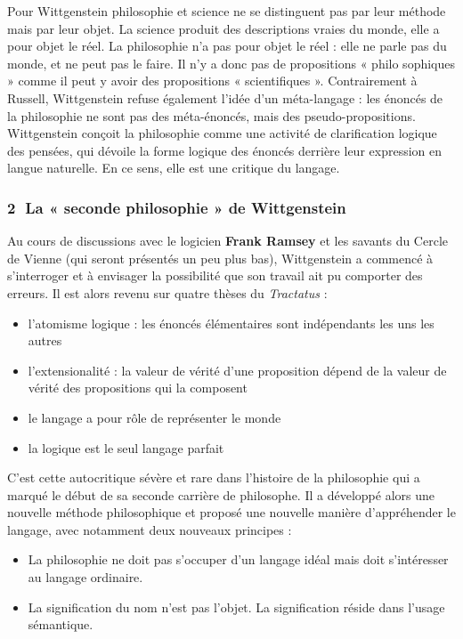 Pour Wittgenstein philosophie et science ne se distinguent pas par leur méthode mais par leur objet. La science produit des descriptions vraies du monde, elle a pour objet le réel. La philosophie n’a pas pour objet le réel : elle ne parle pas du monde, et ne peut pas le faire. Il n’y a donc pas de propositions « philo sophiques » comme il peut y avoir des propositions « scientifiques ». Contrairement à Russell, Wittgenstein refuse également l’idée d’un méta-langage : les énoncés de la philosophie ne sont pas des méta-énoncés, mais des pseudo-propositions. Wittgenstein conçoit la philosophie comme une activité de clarification logique des pensées, qui dévoile la forme logique des énoncés derrière leur expression en langue naturelle. En ce sens, elle est une critique du langage.

\subsubsection*{\textcircled{\scriptsize 2} La « seconde philosophie » de Wittgenstein}
Au cours de discussions avec le logicien \textbf{Frank Ramsey} et les savants du Cercle de Vienne (qui seront présentés un peu plus bas), Wittgenstein a commencé à s’interroger et à envisager la possibilité que son travail ait pu comporter des erreurs. Il est alors revenu sur quatre thèses du \textit{Tractatus} :
\begin{itemize}
\item l’atomisme logique : les énoncés élémentaires sont indépendants les uns les autres
\item l’extensionalité : la valeur de vérité d’une proposition dépend de la valeur de vérité des propositions qui la composent
\item le langage a pour rôle de représenter le monde
\item la logique est le seul langage parfait
\end{itemize}
C’est cette autocritique sévère et rare dans l’histoire de la philosophie qui a marqué le début de sa seconde carrière de philosophe. Il a développé alors une nouvelle méthode philosophique et proposé une nouvelle manière d’appréhender le langage, avec notamment deux nouveaux principes :
\begin{itemize}
\item La philosophie ne doit pas s’occuper d’un langage idéal mais doit s’intéresser au langage ordinaire.
\item La signification du nom n’est pas l’objet. La signification réside dans l’usage sémantique.
\end{itemize}

